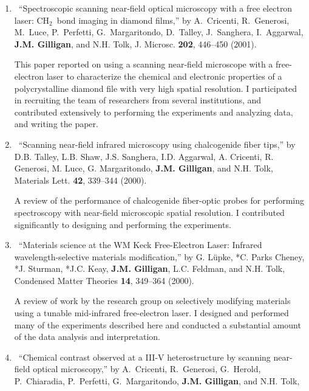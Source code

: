 \begin{enumerate}
\begin{credit}
	\end{credit}
%
	\item
	\textdagger\ 
	\enquote{Spectroscopic scanning near-field optical microscopy with a free
	  electron laser: {CH$_2$}~bond imaging in diamond films,}  by A.~Cricenti,
	  R.~Generosi, M.~Luce, P.~Perfetti, G.~Margaritondo, D.~Talley, J.~Sanghera,
	  I.~Aggarwal, \textbf{J.M. Gilligan}, and N.H. Tolk, J. Microsc. \textbf{202},
	  446--450 (2001). 
	  \begin{credit}
	  This paper reported on using a scanning near-field microscope with a free-electron laser to characterize the chemical and electronic properties of a polycrystalline diamond file with very high spatial resolution.
	  I participated in recruiting the team of researchers from several institutions, and contributed extensively to performing the experiments and analyzing data, and writing the paper.
	  \end{credit}
%
	\item
	\textdagger\ 
	\enquote{Scanning near-field infrared microscopy using chalcogenide fiber tips,} by D.B. Talley, L.B. Shaw, J.S. Sanghera, I.D. Aggarwal, A. Cricenti, R. Generosi, M. Luce, G. Margaritondo, \textbf{J.M. Gilligan}, and N.H. Tolk, Materials Lett. \textbf{42}, 339--344 (2000).
	\begin{credit}
	A review of the performance of chalcogenide fiber-optic probes for performing spectroscopy with near-field microscopic spatial resolution.
	I contributed significantly to designing and performing the experiments.
	\end{credit}
%	
	\item
	\textdagger\ 
	\enquote{Materials science at the WM Keck Free-Electron Laser: Infrared wavelength-selective materials modification,} by G. L\"upke, *C. Parks Cheney, *J. Sturman, *J.C. Keay, \textbf{J.M. Gilligan}, L.C. Feldman, and N.H. Tolk, Condensed Matter Theories \textbf{14}, 349--364 (2000).
	\begin{credit}
	A review of work by the research group on selectively modifying materials using a tunable mid-infrared free-electron laser.
	I designed and performed many of the experiments described here and conducted a substantial amount of the data analysis and interpretation.
	\end{credit}
%	
	\item
	\textdagger\ 
	\enquote{Chemical contrast observed at a {III-V} heterostructure by scanning
	  near-field optical microscopy,}  by A.~Cricenti, R.~Generosi, G.~Herold,
	  P.~Chiaradia, P.~Perfetti, G.~Margaritondo, \textbf{J.M. Gilligan}, and N.H. Tolk,

\end{enumerate}
